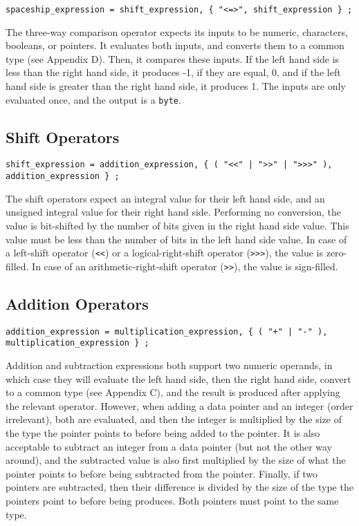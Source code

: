 \documentclass[letterpaper,12pt]{book}
\begin{document}
\begin{lstlisting}[breaklines=true]
spaceship_expression = shift_expression, { "<=>", shift_expression } ;
\end{lstlisting}

The three-way comparison operator expects its inputs to be numeric, characters, booleans, or pointers. It evaluates both inputs, and converts them to a common type (see Appendix D). Then, it compares these inputs. If the left hand side is less than the right hand side, it produces -1, if they are equal, 0, and if the left hand side is greater than the right hand side, it produces 1. The inputs are only evaluated once, and the output is a \texttt{byte}.

\subsection{Shift Operators}

\begin{lstlisting}[breaklines=true]
shift_expression = addition_expression, { ( "<<" | ">>" | ">>>" ), addition_expression } ;
\end{lstlisting}

The shift operators expect an integral value for their left hand side, and an unsigned integral value for their right hand side. Performing no conversion, the value is bit-shifted by the number of bits given in the right hand side value. This value must be less than the number of bits in the left hand side value. In case of a left-shift operator (\texttt{<<}) or a logical-right-shift operator (\texttt{>>>}), the value is zero-filled. In case of an arithmetic-right-shift operator (\texttt{>>}), the value is sign-filled.

\subsection{Addition Operators}

\begin{lstlisting}[breaklines=true]
addition_expression = multiplication_expression, { ( "+" | "-" ), multiplication_expression } ;
\end{lstlisting}

Addition and subtraction expressions both support two numeric operands, in which case they will evaluate the left hand side, then the right hand side, convert to a common type (see Appendix C), and the result is produced after applying the relevant operator. However, when adding a data pointer and an integer (order irrelevant), both are evaluated, and then the integer is multiplied by the size of the type the pointer points to before being added to the pointer. It is also acceptable to subtract an integer from a data pointer (but not the other way around), and the subtracted value is also first multiplied by the size of what the pointer points to before being subtracted from the pointer. Finally, if two pointers are subtracted, then their difference is divided by the size of the type the pointers point to before being produces. Both pointers must point to the same type.
\end{document}
